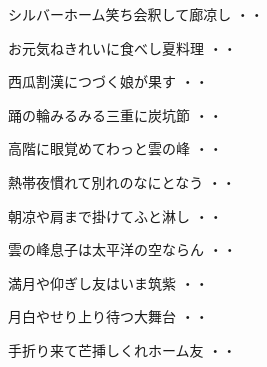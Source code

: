\begin{shiika}シルバーホーム笑ち会釈して廊凉し
\hfill{・・}\end{shiika}
\vspace{0.6cm}
\begin{shiika}お元気ねきれいに食べし夏料理
\hfill{・・}\end{shiika}
\vspace{0.6cm}
\begin{shiika}西瓜割漢につづく娘が果す
\hfill{・・}\end{shiika}
\vspace{0.6cm}
\begin{shiika}踊の輪みるみる三重に炭坑節
\hfill{・・}\end{shiika}
\vspace{0.6cm}
\begin{shiika}高階に眼覚めてわっと雲の峰
\hfill{・・}\end{shiika}
\vspace{0.6cm}
\begin{shiika}熱帯夜慣れて別れのなにとなう
\hfill{・・}\end{shiika}
\vspace{0.6cm}
\begin{shiika}朝凉や肩まで掛けてふと淋し
\hfill{・・}\end{shiika}
\vspace{0.6cm}
\begin{shiika}雲の峰息子は太平洋の空ならん
\hfill{・・}\end{shiika}
\vspace{0.6cm}
\begin{shiika}満月や仰ぎし友はいま筑紫
\hfill{・・}\end{shiika}
\vspace{0.6cm}
\begin{shiika}月白やせり上り待つ大舞台
\hfill{・・}\end{shiika}
\vspace{0.6cm}
\begin{shiika}手折り来て芒挿しくれホーム友
\hfill{・・}\end{shiika}
\vspace{0.6cm}
